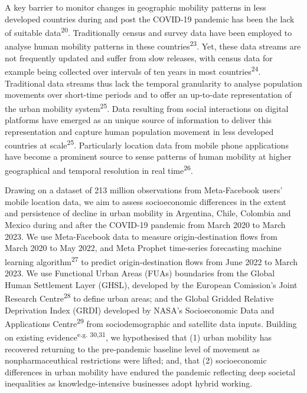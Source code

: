 \documentclass[
  11pt,
]{article}
\begin{document}
A key barrier to monitor changes in geographic mobility patterns in less
developed countries during and post the COVID-19 pandemic has been the
lack of suitable data\textsuperscript{20}. Traditionally census and
survey data have been employed to analyse human mobility patterns in
these countries\textsuperscript{23}. Yet, these data streams are not
frequently updated and suffer from slow releases, with census data for
example being collected over intervals of ten years in most
countries\textsuperscript{24}. Traditional data streams thus lack the
temporal granularity to analyse population movements over short-time
periods and to offer an up-to-date representation of the urban mobility
system\textsuperscript{25}. Data resulting from social interactions on
digital platforms have emerged as an unique source of information to
deliver this representation and capture human population movement in
less developed countries at scale\textsuperscript{25}. Particularly
location data from mobile phone applications have become a prominent
source to sense patterns of human mobility at higher geographical and
temporal resolution in real time\textsuperscript{26}.

Drawing on a dataset of 213 million observations from Meta-Facebook
users' mobile location data, we aim to assess socioeconomic differences
in the extent and persistence of decline in urban mobility in Argentina,
Chile, Colombia and Mexico during and after the COVID-19 pandemic from
March 2020 to March 2023. We use Meta-Facebook data to measure
origin-destination flows from March 2020 to May 2022, and Meta Prophet
time-series forecasting machine learning algorithm\textsuperscript{27}
to predict origin-destination flows from June 2022 to March 2023. We use
Functional Urban Areas (FUAs) boundaries from the Global Human
Settlement Layer (GHSL), developed by the European Comission's Joint
Research Centre\textsuperscript{28} to define urban areas; and the
Global Gridded Relative Deprivation Index (GRDI) developed by NASA's
Socioeconomic Data and Applications Centre\textsuperscript{29} from
sociodemographic and satellite data inputs. Building on existing
evidence\textsuperscript{e.g. 30,31}, we hypothesised that (1) urban
mobility has recovered returning to the pre-pandemic baseline level of
movement as nonpharmaceuthical restrictions were lifted; and, that (2)
socioeconomic differences in urban mobility have endured the pandemic
reflecting deep societal inequalities as knowledge-intensive businesses
adopt hybrid working. \\
\end{document}
